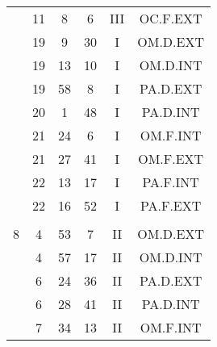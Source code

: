 \documentclass[12pt, a4paper]{article}
\begin{document}
\begin{multicols}{3}
{\begin{tabular}{c c c c c c}
	 	 	 	 & 11 & 8 & 6 & III & OC.F.EXT\\%
	 	 	 	 & 19 & 9 & 30 & I & OM.D.EXT\\%
	 	 	 	 & 19 & 13 & 10 & I & OM.D.INT\\%
	 	 	 	 & 19 & 58 & 8 & I & PA.D.EXT\\%
	 	 	 	 & 20 & 1 & 48 & I & PA.D.INT\\%
	 	 	 	 & 21 & 24 & 6 & I & OM.F.INT\\%
	 	 	 	 & 21 & 27 & 41 & I & OM.F.EXT\\%
	 	 	 	 & 22 & 13 & 17 & I & PA.F.INT\\%
	 	 	 	 & 22 & 16 & 52 & I & PA.F.EXT\\%
	 	 	 	 & & & & & \\%
	 	 	 	8 & 4 & 53 & 7 & II & OM.D.EXT\\%
	 	 	 	 & 4 & 57 & 17 & II & OM.D.INT\\%
	 	 	 	 & 6 & 24 & 36 & II & PA.D.EXT\\%
	 	 	 	 & 6 & 28 & 41 & II & PA.D.INT\\%
	 	 	 	 & 7 & 34 & 13 & II & OM.F.INT\\%
	 	 \end{tabular}
 	}
\end{multicols}
\end{document}
